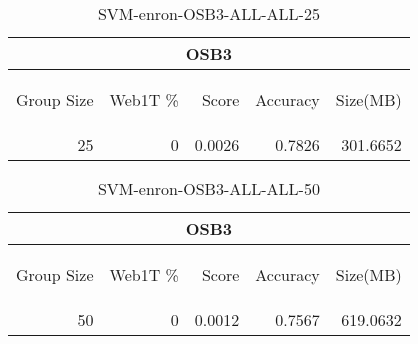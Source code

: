 \begin{center}
\begin{table}[htbp] 
 \begin{center}
\begin{tabular}{ | r | r | r | r | r |}
\hline
\multicolumn{5}{|c|}{OSB3}\\
\hline
\begin{sideways}Group Size\end{sideways} & \begin{sideways}Web1T \%\end{sideways} & \begin{sideways}Score\end{sideways} & \begin{sideways}Accuracy\end{sideways} & \begin{sideways}Size(MB)\end{sideways}\\
\hline
\multirow{0}{*}{25}
 & 0 & 0.0026 & 0.7826 & 301.6652\\ \cline{2-5}
\hline
\end{tabular}
\caption{SVM-enron-OSB3-ALL-ALL-25}
\label{table:SVM-enron-OSB3-ALL-ALL-25}
\end{center}
 \end{table}
\end{center}

\begin{center}
\begin{table}[htbp] 
 \begin{center}
\begin{tabular}{ | r | r | r | r | r |}
\hline
\multicolumn{5}{|c|}{OSB3}\\
\hline
\begin{sideways}Group Size\end{sideways} & \begin{sideways}Web1T \%\end{sideways} & \begin{sideways}Score\end{sideways} & \begin{sideways}Accuracy\end{sideways} & \begin{sideways}Size(MB)\end{sideways}\\
\hline
\multirow{0}{*}{50}
 & 0 & 0.0012 & 0.7567 & 619.0632\\ \cline{2-5}
\hline
\end{tabular}
\caption{SVM-enron-OSB3-ALL-ALL-50}
\label{table:SVM-enron-OSB3-ALL-ALL-50}
\end{center}
 \end{table}
\end{center}

